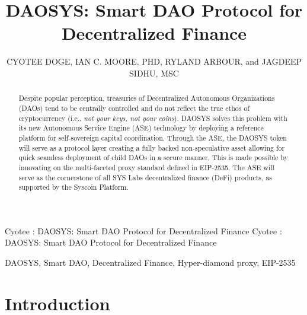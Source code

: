 \documentclass[journal,twocolumn,12pt]{ieeesyscoin}
\begin{document}
\history{}

\title{\centering DAOSYS: Smart DAO Protocol for Decentralized Finance}
\author{\centering  \uppercase{Cyotee Doge}, 
\uppercase{Ian C. Moore, PhD},
\uppercase{Ryland Arbour}, and
\uppercase{Jagdeep Sidhu, MSc}}

\address[1]{\centering DAO Advisor, Syscoin Platform (e-mail: cyotee@syscoin.org)}
\address[2]{\centering  Syscoin Researcher, Syscoin Platform (e-mail: imoore@syscoin.org)}
\address[3]{\centering  L2 Advisor, Syscoin Platform (e-mail: rylandarbour@syscoin.org)}
\address[4]{\centering Syscoin Lead Developer, (e-mail: sidhujag@syscoin.org)}
\tfootnote{}

\markboth
{Cyotee \headeretal: DAOSYS: Smart DAO Protocol for Decentralized Finance}
{Cyotee \headeretal: DAOSYS: Smart DAO Protocol for Decentralized Finance}

\corresp{}

\begin{abstract}
Despite popular perception, treasuries of Decentralized Autonomous Organizations (DAOs) tend to be centrally controlled and do not reflect the true ethos of cryptocurrency (i.e., \textit{not your keys, not your coins}). DAOSYS solves this problem with its new Autonomous Service Engine (ASE) technology by deploying a reference platform for self-sovereign capital coordination. Through the ASE, the DAOSYS token will serve as a protocol layer creating a fully backed non-speculative asset allowing for quick seamless deployment of child DAOs in a secure manner. This is made possible by innovating on the multi-faceted proxy standard defined in EIP-2535. The ASE will serve as the cornerstone of all SYS Labs decentralized finance (DeFi) products, as supported by the Syscoin Platform.
\end{abstract}

\begin{keywords}
DAOSYS, Smart DAO, Decentralized Finance, Hyper-diamond proxy, EIP-2535
\end{keywords}

\titlepgskip=-15pt

\maketitle

\section{Introduction}
\label{sec:introduction}
\end{document}
